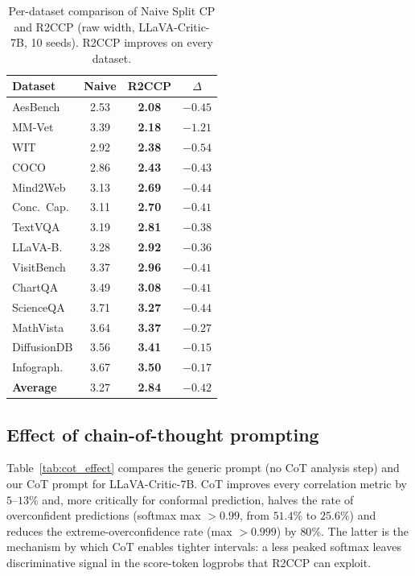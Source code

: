 \documentclass{article}
\begin{document}
\begin{table}[t]
\centering
\caption{Per-dataset comparison of Naive Split CP and R2CCP (raw width, LLaVA-Critic-7B, 10 seeds). R2CCP improves on every dataset.}
\label{tab:naive_vs_r2ccp}
\small
\begin{tabular}{lccc}
\toprule
\textbf{Dataset} & \textbf{Naive} & \textbf{R2CCP} & $\Delta$ \\
\midrule
AesBench & 2.53 & \textbf{2.08} & $-0.45$ \\
MM-Vet & 3.39 & \textbf{2.18} & $-1.21$ \\
WIT & 2.92 & \textbf{2.38} & $-0.54$ \\
COCO & 2.86 & \textbf{2.43} & $-0.43$ \\
Mind2Web & 3.13 & \textbf{2.69} & $-0.44$ \\
Conc.\ Cap. & 3.11 & \textbf{2.70} & $-0.41$ \\
TextVQA & 3.19 & \textbf{2.81} & $-0.38$ \\
LLaVA-B. & 3.28 & \textbf{2.92} & $-0.36$ \\
VisitBench & 3.37 & \textbf{2.96} & $-0.41$ \\
ChartQA & 3.49 & \textbf{3.08} & $-0.41$ \\
ScienceQA & 3.71 & \textbf{3.27} & $-0.44$ \\
MathVista & 3.64 & \textbf{3.37} & $-0.27$ \\
DiffusionDB & 3.56 & \textbf{3.41} & $-0.15$ \\
Infograph. & 3.67 & \textbf{3.50} & $-0.17$ \\
\midrule
\textbf{Average} & 3.27 & \textbf{2.84} & $-0.42$ \\
\bottomrule
\end{tabular}
\end{table}

\subsection{Effect of chain-of-thought prompting}
\label{app:cot}

Table~\ref{tab:cot_effect} compares the generic prompt (no CoT analysis step) and our CoT prompt for LLaVA-Critic-7B. CoT improves every correlation metric by $5$--$13\%$ and, more critically for conformal prediction, halves the rate of overconfident predictions (softmax max $> 0.99$, from $51.4\%$ to $25.6\%$) and reduces the extreme-overconfidence rate (max $> 0.999$) by $80\%$. The latter is the mechanism by which CoT enables tighter intervals: a less peaked softmax leaves discriminative signal in the score-token logprobs that R2CCP can exploit.
\end{document}
